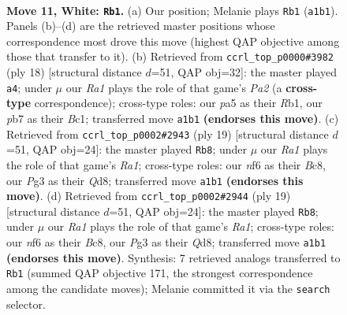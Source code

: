 \documentclass[11pt]{article}
\begin{document}
\begin{figure}[p]
\label{fig:thought-m18}
\end{figure}

\clearpage

\begin{figure}[p]\centering
\begin{subfigure}{0.46\textwidth}\centering
\resizebox{\linewidth}{!}{%
\newchessgame
\chessboard[
  setfen={r1bq1rk1/1p3pb1/2np1np1/p1p1p2p/2P4P/BPN3P1/P2PPPB1/R2QNRK1 w - - 0 11},
  showmover=false,
  pgfstyle=straightmove, color=movearrow, markmove={a1-b1}
]}
\caption{}
\end{subfigure}\hfill
\begin{subfigure}{0.46\textwidth}\centering
\resizebox{\linewidth}{!}{%
\newchessgame
\chessboard[
  setfen={r1bq1rk1/1pp3bp/p1np1np1/4pp2/1PP5/2NP1NP1/P3PPBP/1RBQ1RK1 w - - 2 10},
  showmover=false,
  pgfstyle=straightmove, color=movearrow, markmove={a2-a4}
]}
\caption{}
\end{subfigure}
\\[4pt]
\begin{subfigure}{0.46\textwidth}\centering
\resizebox{\linewidth}{!}{%
\newchessgame
\chessboard[
  setfen={r1bqr1k1/bpp2ppp/p1np1n2/4p3/2P5/1PNPPNPP/P4PB1/R1BQ1RK1 b - - 0 10},
  showmover=false,
  pgfstyle=straightmove, color=movearrow, markmove={a8-b8}
]}
\caption{}
\end{subfigure}\hfill
\begin{subfigure}{0.46\textwidth}\centering
\resizebox{\linewidth}{!}{%
\newchessgame
\chessboard[
  setfen={r1bqr1k1/bpp2ppp/p1np1n2/4p3/2P5/1PNPPNPP/P4PB1/R1BQ1RK1 b - - 0 10},
  showmover=false,
  pgfstyle=straightmove, color=movearrow, markmove={a8-b8}
]}
\caption{}
\end{subfigure}
\caption{\textbf{Move 11, White: \texttt{Rb1}.} (a) Our position; Melanie plays \texttt{Rb1} (\texttt{a1b1}). Panels (b)--(d) are the retrieved master positions whose correspondence most drove this move (highest QAP objective among those that transfer to it). (b) Retrieved from \texttt{ccrl\_top\_p0000\#3982} (ply 18) [structural distance $d$=51, QAP obj=32]: the master played \texttt{a4}; under $\mu$ our \emph{Ra1} plays the role of that game's \emph{Pa2} (a \textbf{cross-type} correspondence); cross-type roles: our \emph{p}a5 as their \emph{R}b1, our \emph{p}b7 as their \emph{B}c1; transferred move \texttt{a1b1} \textbf{(endorses this move)}. (c) Retrieved from \texttt{ccrl\_top\_p0002\#2943} (ply 19) [structural distance $d$=51, QAP obj=24]: the master played \texttt{Rb8}; under $\mu$ our \emph{Ra1} plays the role of that game's \emph{Ra1}; cross-type roles: our \emph{n}f6 as their \emph{B}c8, our \emph{P}g3 as their \emph{Q}d8; transferred move \texttt{a1b1} \textbf{(endorses this move)}. (d) Retrieved from \texttt{ccrl\_top\_p0002\#2944} (ply 19) [structural distance $d$=51, QAP obj=24]: the master played \texttt{Rb8}; under $\mu$ our \emph{Ra1} plays the role of that game's \emph{Ra1}; cross-type roles: our \emph{n}f6 as their \emph{B}c8, our \emph{P}g3 as their \emph{Q}d8; transferred move \texttt{a1b1} \textbf{(endorses this move)}. Synthesis: 7 retrieved analogs transferred to \texttt{Rb1} (summed QAP objective 171, the strongest correspondence among the candidate moves); Melanie committed it via the \texttt{search} selector.}

\end{figure}
\end{document}
